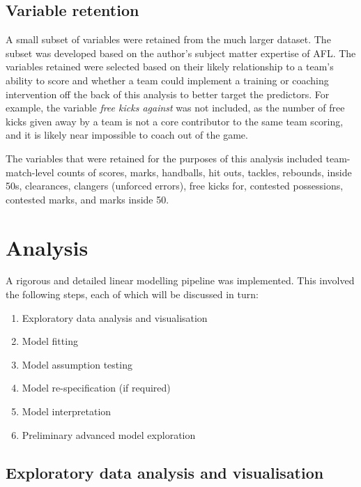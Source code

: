 \documentclass{article}
\begin{document}
\hypertarget{variable-retention}{%
\subsection{Variable retention}\label{variable-retention}}

A small subset of variables were retained from the much larger dataset.
The subset was developed based on the author's subject matter expertise
of AFL. The variables retained were selected based on their likely
relationship to a team's ability to score and whether a team could
implement a training or coaching intervention off the back of this
analysis to better target the predictors. For example, the variable
\emph{free kicks against} was not included, as the number of free kicks
given away by a team is not a core contributor to the same team scoring,
and it is likely near impossible to coach out of the game.

The variables that were retained for the purposes of this analysis
included team-match-level counts of scores, marks, handballs, hit outs,
tackles, rebounds, inside 50s, clearances, clangers (unforced errors),
free kicks for, contested possessions, contested marks, and marks inside
50.

\hypertarget{analysis}{%
\section{Analysis}\label{analysis}}

A rigorous and detailed linear modelling pipeline was implemented. This
involved the following steps, each of which will be discussed in turn:

\begin{enumerate}
\def\labelenumi{\arabic{enumi}.}
\tightlist
\item
  Exploratory data analysis and visualisation
\item
  Model fitting
\item
  Model assumption testing
\item
  Model re-specification (if required)
\item
  Model interpretation
\item
  Preliminary advanced model exploration
\end{enumerate}

\hypertarget{exploratory-data-analysis-and-visualisation}{%
\subsection{Exploratory data analysis and
visualisation}\label{exploratory-data-analysis-and-visualisation}}
\end{document}
